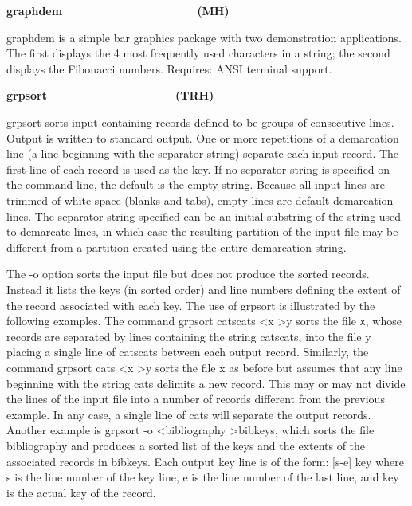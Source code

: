 {{\sffamily\bfseries
graphdem\ \ \ \ \ \ \ \ \ \ \ \ \ \ \ \ \ \ \ \  \ (MH)}

\textsf{graphdem} is a simple bar graphics package with two
demonstration applications. The first displays the 4 most frequently
used characters in a string; the second displays the Fibonacci numbers.
Requires: ANSI terminal support.

{\sffamily\bfseries
grpsort\ \ \ \ \ \ \ \ \ \ \ \ \ \ \ \ \ \ \ \ (TRH)}

\textsf{grpsort} sorts input containing
{\textquotedbl}records{\textquotedbl} defined to be groups of
consecutive lines. Output is written to standard output. One or more
repetitions of a demarcation line (a line beginning with the separator
string) separate each input record. The first line of each record is
used as the key. If no separator string is specified on the command
line, the default is the empty string. Because all input lines are
trimmed of white space (blanks and tabs), empty lines are default
demarcation lines. The separator string specified can be an initial
substring of the string used to demarcate lines, in which case the
resulting partition of the input file may be different from a partition
created using the entire demarcation string.

The \textsf{{}-o} option sorts the input file but does not produce the
sorted records. Instead it lists the keys (in sorted order) and line
numbers defining the extent of the record associated with each key. The
use of grpsort is illustrated by the following examples. The command
\textsf{grpsort {\textquotedbl}catscats{\textquotedbl} {\textless}x
{\textgreater}y} sorts the file \texttt{x}, whose records are separated
by lines containing the string
\textsf{{\textquotedbl}catscats{\textquotedbl}}, into the file
\textsf{y} placing a single line of
\textsf{{\textquotedbl}catscats{\textquotedbl}} between each output
record. Similarly, the command \textsf{grpsort
{\textquotedbl}cats{\textquotedbl} {\textless}x {\textgreater}y} sorts
the file \textsf{x} as before but assumes that any line beginning with
the string \textsf{{\textquotedbl}cats{\textquotedbl}} delimits a new
record. This may or may not divide the lines of the input file into a
number of records different from the previous example. In any case, a
single line of \textsf{{\textquotedbl}cats{\textquotedbl}} will
separate the output records. Another example is \textsf{grpsort -o
{\textless}bibliography {\textgreater}bibkeys}, which sorts the file
bibliography and produces a sorted list of the keys and the extents of
the associated records in bibkeys. Each output key line is of the form:
\textsf{[s-e] key} where \textsf{s} is the line number of the key line,
\textsf{e} is the line number of the last line, and \textsf{key} is the
actual key of the record.

}
